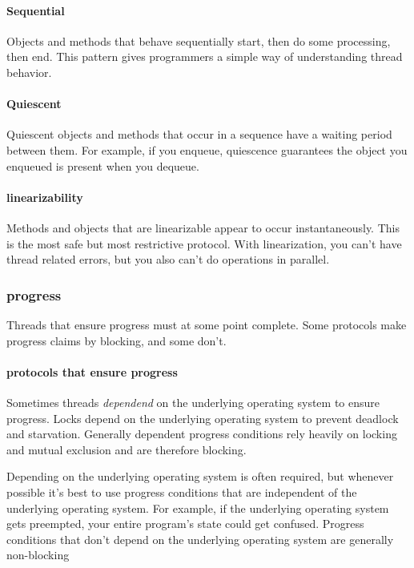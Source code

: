 \documentclass[titlepage]{article}
\begin{document}
\paragraph*{Sequential}

Objects and methods that behave sequentially start, then do some processing, then end. This pattern gives programmers a simple way of understanding thread behavior.

\paragraph*{Quiescent}

Quiescent objects and methods that occur in a sequence have a waiting period between them. For example, if you enqueue, quiescence guarantees the object you enqueued is present when you dequeue.

\paragraph*{linearizability}

Methods and objects that are linearizable appear to occur instantaneously. This is the most safe but most restrictive protocol. With linearization, you can't have thread related errors, but you also can't do operations in parallel.

\subsubsection{progress}

Threads that ensure progress must at some point complete. Some protocols make progress claims by blocking, and some don't.

\paragraph{protocols that ensure progress}

Sometimes threads \textit{dependend} on the underlying operating system to ensure progress. Locks depend on the underlying operating system to prevent deadlock and starvation. Generally dependent progress conditions rely heavily on locking and mutual exclusion and are therefore blocking.

Depending on the underlying operating system is often required, but whenever possible it's best to use progress conditions that are independent of the underlying operating system. For example, if the underlying operating system gets preempted, your entire program's state could get confused. Progress conditions that don't depend on the underlying operating system are generally non-blocking
\end{document}
